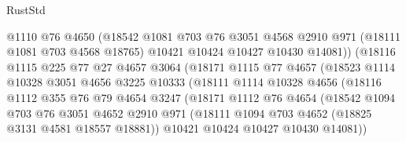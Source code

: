 \begin{lexlean}{RustStd}
\begin{coremodule}
                            @1110
                            @76
                            @4650
                            (@18542
                              @1081
                              @703
                              @76
                              @3051
                              @4568
                              @2910
                              @971
                              (@18111 @1081 @703 @4568 @18765)
                              @10421
                              @10424
                              @10427
                              @10430
                              @14081))
                          (@18116
                            @1115
                            @225
                            @77
                            @27
                            @4657
                            @3064
                            (@18171
                              @1115
                              @77
                              @4657
                              (@18523
                                @1114
                                @10328
                                @3051
                                @4656
                                @3225
                                @10333
                                (@18111
                                  @1114
                                  @10328
                                  @4656
                                  (@18116
                                    @1112
                                    @355
                                    @76
                                    @79
                                    @4654
                                    @3247
                                    (@18171
                                      @1112
                                      @76
                                      @4654
                                      (@18542
                                        @1094
                                        @703
                                        @76
                                        @3051
                                        @4652
                                        @2910
                                        @971
                                        (@18111 @1094 @703 @4652 (@18825 @3131 @4581 @18557 @18881))
                                        @10421
                                        @10424
                                        @10427
                                        @10430
                                        @14081))

\end{coremodule}
\end{lexlean}
